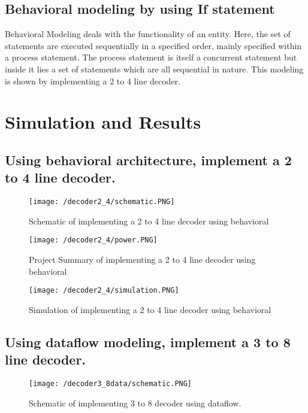\subsection{ Behavioral modeling by using If statement}
Behavioral Modeling deals with the functionality of an entity. Here, the set of statements are executed sequentially in a specified order, mainly specified within a process statement. The process statement is itself a concurrent statement but inside it lies a set of statements which are all sequential in nature.
This modeling is shown by implementing a 2 to 4 line decoder.

\clearpage
\section{Simulation and Results}

\subsection{Using behavioral architecture, implement a 2 to 4 line decoder. }
\begin{figure}[h!]
\centering
\texttt{[image: /decoder2\_4/schematic.PNG]}
\caption{Schematic of implementing a 2 to 4 line decoder using behavioral}
\label{figure:1}
\end{figure}


\begin{figure}[h!]
\centering
\texttt{[image: /decoder2\_4/power.PNG]}
\caption{Project Summary of implementing a 2 to 4 line decoder using behavioral}
\label{figure:2}


\end{figure}


\begin{figure}[h!]
\centering
\texttt{[image: /decoder2\_4/simulation.PNG]}
\caption{Simulation of implementing a 2 to 4 line decoder using behavioral}
\label{figure:3}
\end{figure}

\FloatBarrier   \clearpage

\subsection{Using dataflow modeling, implement a 3 to 8 line decoder.  }
\begin{figure}[h!]
\centering
\texttt{[image: /decoder3\_8data/schematic.PNG]}
\caption{Schematic of implementing 3 to 8 decoder using dataflow.}
\label{figure:1}
\end{figure}


